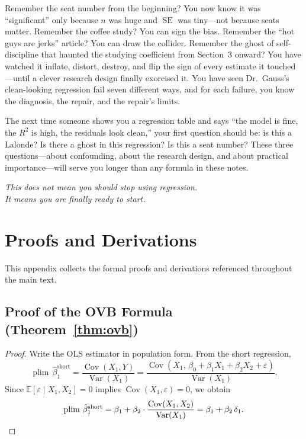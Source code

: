 \documentclass[11pt,a4paper]{article}
\theoremstyle{definition}
\theoremstyle{plain}
\theoremstyle{remark}
\newcommand{\E}{\mathbb{E}}
\newcommand{\Var}{\operatorname{Var}}
\newcommand{\Cov}{\operatorname{Cov}}
\newcommand{\se}{\operatorname{SE}}
\newcommand{\plim}{\operatorname{plim}}
\newcommand{\bhat}{\hat{\beta}}
\begin{document}
Remember the seat number from the beginning? You now know it was ``significant'' only because $n$ was huge and $\se$ was tiny---not because seats matter. Remember the coffee study? You can sign the bias. Remember the ``hot guys are jerks'' article? You can draw the collider. Remember the ghost of self-discipline that haunted the studying coefficient from Section~3 onward? You have watched it inflate, distort, destroy, and flip the sign of every estimate it touched---until a clever research design finally exorcised it. You have seen Dr.\ Gauss's clean-looking regression fail seven different ways, and for each failure, you know the diagnosis, the repair, and the repair's limits.

The next time someone shows you a regression table and says ``the model is fine, the $R^2$ is high, the residuals look clean,'' your first question should be: is this a Lalonde? Is there a ghost in this regression? Is this a seat number? These three questions---about confounding, about the research design, and about practical importance---will serve you longer than any formula in these notes.

\vspace{1cm}
\begin{center}
\textit{This does not mean you should stop using regression.\\
It means you are finally ready to start.}
\end{center}

\appendix
\section{Proofs and Derivations}\label{app:proofs}

This appendix collects the formal proofs and derivations referenced throughout the main text.

\subsection{Proof of the OVB Formula (Theorem~\ref{thm:ovb})}

\begin{proof}
Write the OLS estimator in population form.  From the short regression,
\[
  \plim\, \bhat_1^{\text{short}}
  = \frac{\Cov(X_1, Y)}{\Var(X_1)}
  = \frac{\Cov(X_1,\, \beta_0 + \beta_1 X_1 + \beta_2 X_2 + \varepsilon)}{\Var(X_1)}.
\]
Since $\E[\varepsilon \mid X_1, X_2] = 0$ implies $\Cov(X_1, \varepsilon) = 0$, we obtain
\[
  \plim\, \bhat_1^{\text{short}}
  = \beta_1 + \beta_2 \cdot \frac{\Cov(X_1, X_2)}{\Var(X_1)}
  = \beta_1 + \beta_2 \, \delta_1. \qedhere
\]
\end{proof}
\end{document}

